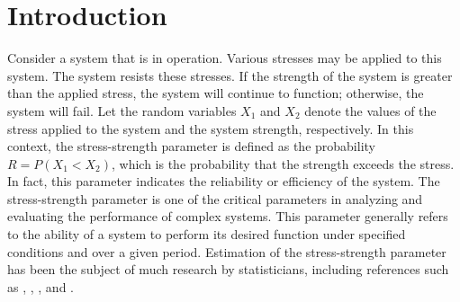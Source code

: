 \documentclass[twoside]{article}
\begin{document}
\section{Introduction}
Consider a system that is in operation. Various stresses may be applied to this system. The system resists these stresses. If the strength of the system is greater than the applied stress, the system will continue to function; otherwise, the system will fail. Let the random variables \(X_1\) and \(X_2\) denote the values of the stress applied to the system and the system strength, respectively. In this context, the stress-strength parameter is defined as the probability \(R = P(X_1 < X_2)\), which is the probability that the strength exceeds the stress. In fact, this parameter indicates the reliability or efficiency of the system. The stress-strength parameter is one of the critical parameters in analyzing and evaluating the performance of complex systems. This parameter generally refers to the ability of a system to perform its desired function under specified conditions and over a given period. Estimation of the stress-strength parameter has been the subject of much research by statisticians, including references such as \cite{Ahmad:1997},   \cite{Raqab:2008}, \cite{Kundu:2009}, and \cite{Rao:2013}.
\end{document}
